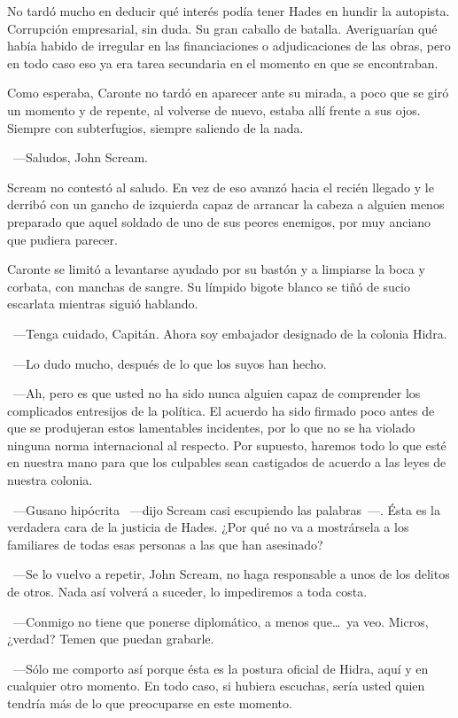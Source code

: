 No tardó mucho en deducir qué interés podía tener Hades en hundir la autopista. Corrupción empresarial, sin duda. Su gran caballo de batalla. Averiguarían qué había habido de irregular en las financiaciones o adjudicaciones de las obras, pero en todo caso eso ya era tarea secundaria en el momento en que se encontraban.

Como esperaba, Caronte no tardó en aparecer ante su mirada, a poco que se giró un momento y de repente, al volverse de nuevo, estaba allí frente a sus ojos. Siempre con subterfugios, siempre saliendo de la nada.

~---Saludos, John Scream.

Scream no contestó al saludo. En vez de eso avanzó hacia el recién llegado y le derribó con un gancho de izquierda capaz de arrancar la cabeza a alguien menos preparado que aquel soldado de uno de sus peores enemigos, por muy anciano que pudiera parecer.

Caronte se limitó a levantarse ayudado por su bastón y a limpiarse la boca y corbata, con manchas de sangre. Su límpido bigote blanco se tiñó de sucio escarlata mientras siguió hablando.

~---Tenga cuidado, Capitán. Ahora soy embajador designado de la colonia Hidra.

~---Lo dudo mucho, después de lo que los suyos han hecho.

~---Ah, pero es que usted no ha sido nunca alguien capaz de comprender los complicados entresijos de la política. El acuerdo ha sido firmado poco antes de que se produjeran estos lamentables incidentes, por lo que no se ha violado ninguna norma internacional al respecto. Por supuesto, haremos todo lo que esté en nuestra mano para que los culpables sean castigados de acuerdo a las leyes de nuestra colonia.

~---Gusano hipócrita ~---dijo Scream casi escupiendo las palabras~---. Ésta es la verdadera cara de la justicia de Hades. ¿Por qué no va a mostrársela a los familiares de todas esas personas a las que han asesinado?

~---Se lo vuelvo a repetir, John Scream, no haga responsable a unos de los delitos de otros. Nada así volverá a suceder, lo impediremos a toda costa.

~---Conmigo no tiene que ponerse diplomático, a menos que\dots\ ya veo. Micros, ¿verdad? Temen que puedan grabarle.

~---Sólo me comporto así porque ésta es la postura oficial de Hidra, aquí y en cualquier otro momento. En todo caso, si hubiera escuchas, sería usted quien tendría más de lo que preocuparse en este momento.

